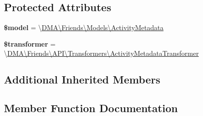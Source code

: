 \subsection*{Protected Attributes}
\begin{DoxyCompactItemize}
\item 
\hypertarget{classDMA_1_1Friends_1_1API_1_1Resources_1_1ActivityMetadataResource_a2d8840084ab4089cd0be441fa95b9357}{}{\bfseries \$model} = \textquotesingle{}\textbackslash{}\hyperlink{classDMA_1_1Friends_1_1Models_1_1ActivityMetadata}{D\+M\+A\textbackslash{}\+Friends\textbackslash{}\+Models\textbackslash{}\+Activity\+Metadata}\textquotesingle{}\label{classDMA_1_1Friends_1_1API_1_1Resources_1_1ActivityMetadataResource_a2d8840084ab4089cd0be441fa95b9357}

\item 
\hypertarget{classDMA_1_1Friends_1_1API_1_1Resources_1_1ActivityMetadataResource_a4aef74cbec209367d4eb75887f9dfedb}{}{\bfseries \$transformer} = \textquotesingle{}\textbackslash{}\hyperlink{classDMA_1_1Friends_1_1API_1_1Transformers_1_1ActivityMetadataTransformer}{D\+M\+A\textbackslash{}\+Friends\textbackslash{}\+A\+P\+I\textbackslash{}\+Transformers\textbackslash{}\+Activity\+Metadata\+Transformer}\textquotesingle{}\label{classDMA_1_1Friends_1_1API_1_1Resources_1_1ActivityMetadataResource_a4aef74cbec209367d4eb75887f9dfedb}

\end{DoxyCompactItemize}
\subsection*{Additional Inherited Members}


\subsection{Member Function Documentation}
\hypertarget{classDMA_1_1Friends_1_1API_1_1Resources_1_1ActivityMetadataResource_add571e6be47126c2bee474f570c566ab}{}
